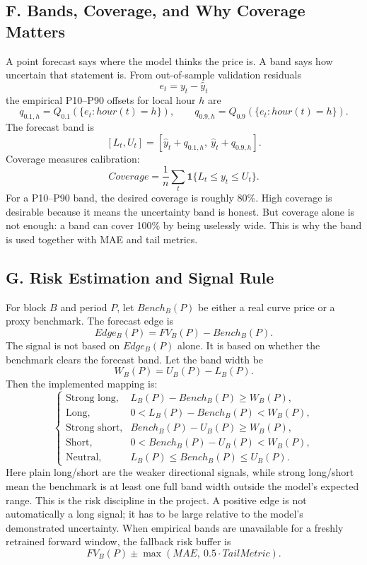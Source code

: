 \documentclass[10pt,a4paper]{article}
\begin{document}
\subsection*{F. Bands, Coverage, and Why Coverage Matters}
A point forecast says where the model thinks the price is. A band says how uncertain that statement is. From out-of-sample validation residuals
\[
  e_t=y_t-\hat{y}_t
\]
the empirical P10--P90 offsets for local hour $h$ are
\[
  q_{0.1,h}=Q_{0.1}(\{e_t:hour(t)=h\}),
  \qquad
  q_{0.9,h}=Q_{0.9}(\{e_t:hour(t)=h\}).
\]
The forecast band is
\[
  [L_t,U_t]=[\hat{y}_t+q_{0.1,h},\ \hat{y}_t+q_{0.9,h}].
\]
Coverage measures calibration:
\[
  Coverage=\frac{1}{n}\sum_t\mathbf{1}\{L_t\le y_t\le U_t\}.
\]
For a P10--P90 band, the desired coverage is roughly 80\%. High coverage is desirable because it means the uncertainty band is honest. But coverage alone is not enough: a band can cover 100\% by being uselessly wide. This is why the band is used together with MAE and tail metrics.

\subsection*{G. Risk Estimation and Signal Rule}
For block $B$ and period $P$, let $Bench_B(P)$ be either a real curve price or a proxy benchmark. The forecast edge is
\[
  Edge_B(P)=FV_B(P)-Bench_B(P).
\]
The signal is not based on $Edge_B(P)$ alone. It is based on whether the benchmark clears the forecast band. Let the band width be
\[
  W_B(P)=U_B(P)-L_B(P).
\]
Then the implemented mapping is:
\[
\begin{cases}
\text{Strong long}, & L_B(P)-Bench_B(P)\ge W_B(P),\\
\text{Long}, & 0<L_B(P)-Bench_B(P)< W_B(P),\\
\text{Strong short}, & Bench_B(P)-U_B(P)\ge W_B(P),\\
\text{Short}, & 0<Bench_B(P)-U_B(P)< W_B(P),\\
\text{Neutral}, & L_B(P)\le Bench_B(P)\le U_B(P).
\end{cases}
\]
Here plain long/short are the weaker directional signals, while strong long/short mean the benchmark is at least one full band width outside the model's expected range. This is the risk discipline in the project. A positive edge is not automatically a long signal; it has to be large relative to the model's demonstrated uncertainty. When empirical bands are unavailable for a freshly retrained forward window, the fallback risk buffer is
\[
  FV_B(P)\pm\max(MAE,\ 0.5\cdot TailMetric).
\]
\end{document}
